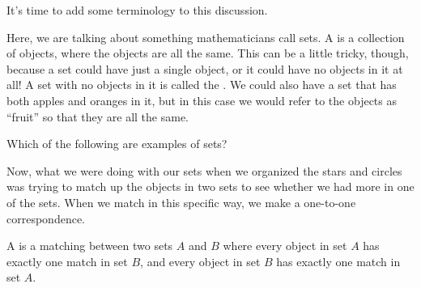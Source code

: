 \documentclass{ximera}
\begin{document}
It's time to add some terminology to this discussion.

Here, we are talking about something mathematicians call sets. A  is a collection of objects, where the objects are all the same. This can be a little tricky, though, because a set could have just a single object, or it could have no objects in it at all! A set with no objects in it is called the . We could also have a set that has both apples and oranges in it, but in this case we would refer to the objects as ``fruit'' so that they are all the same.

\begin{question}
Which of the following are examples of sets?
\begin{selectAll}
\end{selectAll}
\end{question}

Now, what we were doing with our sets when we organized the stars and circles was trying to match up the objects in two sets to see whether we had more in one of the sets. When we match in this specific way, we make a one-to-one correspondence.

\begin{definition}
	A  is a matching between two sets $A$ and $B$ where every object in set $A$ has exactly one match in set $B$, and every object in set $B$ has exactly one match in set $A$.
\end{definition}
\end{document}
